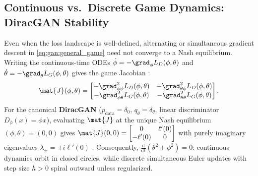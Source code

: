 \documentclass[../../../../master.tex]{subfiles}
\begin{document}

\subsection{Continuous vs.\ Discrete Game Dynamics: DiracGAN Stability}

Even when the loss landscape is well-defined, alternating or simultaneous gradient descent in \eqref{eq:gan:general_game} need not converge to a Nash equilibrium. Writing the continuous-time ODEs $\dot{\phi} = -\grad_\phi L_D(\phi, \theta)$ and $\dot{\theta} = -\grad_\theta L_G(\phi, \theta)$ gives the game Jacobian :
\begin{equation}
  \label{eq:gan:game_jacobian}
  \mat{J}(\phi, \theta) =
  \begin{bmatrix}
    -\grad^2_{\phi\phi} L_D(\phi, \theta) & -\grad^2_{\theta\phi} L_D(\phi, \theta) \\
    -\grad^2_{\phi\theta} L_G(\phi, \theta) & -\grad^2_{\theta\theta} L_G(\phi, \theta)
  \end{bmatrix}.
\end{equation}
For the canonical \textbf{DiracGAN} ($p_{\mathrm{data}} = \delta_0$, $q_\theta = \delta_\theta$, linear discriminator $D_\phi(x) = \phi x$), evaluating $\mat{J}$ at the unique Nash equilibrium $(\phi, \theta) = (0,0)$ gives $\mat{J}(0,0) = \begin{bmatrix} 0 & \ell'(0) \\ -\ell'(0) & 0 \end{bmatrix}$ with purely imaginary eigenvalues $\lambda_\pm = \pm i\ell'(0)$ . Consequently, $\frac{\mathrm{d}}{\mathrm{d}t}(\theta^2 + \phi^2) = 0$: continuous dynamics orbit in closed circles, while discrete simultaneous Euler updates with step size $h > 0$ spiral outward unless regularized.
\end{document}
